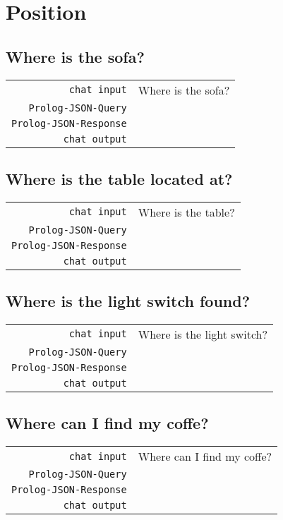 \documentclass[a4paper,oneside]{scrartcl}
\begin{document}
\section{Position}

\subsection{Where is the sofa?}
\begin{tabular}{rl}
	\texttt{chat input}		& Where is the sofa?	\\
	\texttt{Prolog-JSON-Query}	&			\\
	\texttt{Prolog-JSON-Response}	&			\\
	\texttt{chat output}		& 			\\
\end{tabular}

\subsection{Where is the table located at?}
\begin{tabular}{rl}
	\texttt{chat input}		& Where is the table?	\\
	\texttt{Prolog-JSON-Query}	&			\\
	\texttt{Prolog-JSON-Response}	&			\\
	\texttt{chat output}		& 			\\
\end{tabular}

\subsection{Where is the light switch found?}
\begin{tabular}{rl}
	\texttt{chat input}		& Where is the light switch?	\\
	\texttt{Prolog-JSON-Query}	&			\\
	\texttt{Prolog-JSON-Response}	&			\\
	\texttt{chat output}		& 			\\
\end{tabular}

\subsection{Where can I find my coffe?}
\begin{tabular}{rl}
	\texttt{chat input}		& Where can I find my coffe?	\\
	\texttt{Prolog-JSON-Query}	&			\\
	\texttt{Prolog-JSON-Response}	&			\\
	\texttt{chat output}		& 			\\
\end{tabular}
\end{document}
